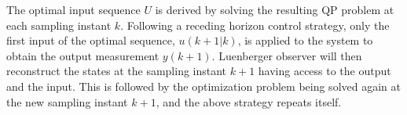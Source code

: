 The optimal input sequence $U$ is derived by solving the resulting QP problem at each sampling instant $k$. Following a receding horizon control strategy, only the first input of the optimal sequence, $u(k+1|k)$, is applied to the system to obtain the output measurement $y(k+1)$. Luenberger observer will then reconstruct the states at the sampling instant $k+1$ having access to the output and the input. This is followed by the optimization problem being solved again at the new sampling instant $k+1$, and the above strategy repeats itself.